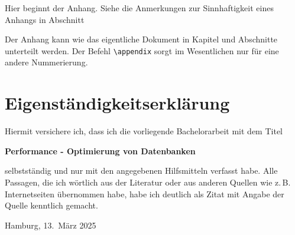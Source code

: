 
\printbibliography

\appendix

Hier beginnt der Anhang.
Siehe die Anmerkungen zur Sinnhaftigkeit eines Anhangs in Abschnitt%

Der Anhang kann wie das eigentliche Dokument in Kapitel und Abschnitte unterteilt werden.
Der Befehl \verb|\appendix| sorgt im Wesentlichen nur für eine andere Nummerierung.

\clearpage

\thispagestyle{empty}

\section*{Eigenständigkeitserklärung}

Hiermit versichere ich, dass ich die vorliegende Bachelorarbeit mit dem Titel
\begin{center}
  \textbf{Performance - Optimierung von Datenbanken}
\end{center}
selbstständig und nur mit den angegebenen Hilfsmitteln verfasst habe.
Alle Passagen, die ich wörtlich aus der Literatur oder aus anderen Quellen wie z.\,B. Internetseiten übernommen habe, habe ich deutlich als Zitat mit Angabe der Quelle kenntlich gemacht.

\vspace{2cm}
Hamburg, 13.\ März 2025
